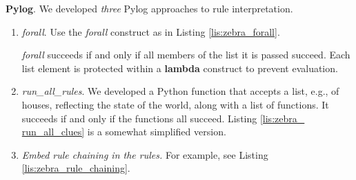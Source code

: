 \smallv
\textbf{Pylog}. We developed \textit{three} Pylog approaches to rule interpretation. 
\begin{enumerate}

\item \textit{forall}. Use the \textit{forall} construct as in Listing \ref{lis:zebra_forall}.


\textit{forall} succeeds if and only if all members of the list it is passed succeed. Each list element is protected within a \textbf{lambda} construct to prevent evaluation.

\item \textit{run\_all\_rules}. We developed a Python function that accepts a list, e.g., of houses, reflecting the state of the world, along with a list of functions. It succeeds if and only if the functions all succeed. Listing \ref{lis:zebra_ run_all_clues} is a somewhat simplified version.


\item \textit{Embed rule chaining in the rules.} For example, see Listing \ref{lis:zebra_rule_chaining}.


\end{enumerate}
